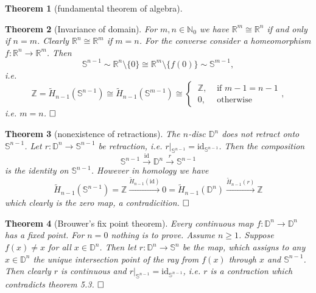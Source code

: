 \documentclass[11pt]{book}
\numberwithin{dummy}{section}
\newtheorem{theorem}{Theorem}[section]
\theoremstyle{nonumberbreak}
\newenvironment{pr}[1][]{\ifthenelse{\equal{#1}{}}{\proof}{\proof[#1]}\rm}{\endproof}
\newcommand{\Sph}{\mathbb{S}}
\newcommand{\la}{\longrightarrow}
\newcommand{\id}{\mathrm{id}}
\newcommand{\Z}{\mathbb{Z}}
\begin{document}
\begin{spacing}{1.4}
\begin{theorem}[fundamental theorem of algebra]
\begin{pr}
\end{pr}

\end{theorem}



\begin{theorem}[Invariance of domain]
For $m,n \in \mathbb{N}_0$ we have $\mathbb{R}^m \cong \mathbb{R}^n$ if and only if $n=m$.
\begin{pr}
Clearly $\mathbb{R}^n \cong \mathbb{R}^m$ if $m=n$. For the converse consider a homeomorphism $f: \mathbb{R}^n \la \mathbb{R}^m$. Then
$$\Sph^{n-1} \sim \mathbb{R}^n \setminus \{0\} \cong \mathbb{R}^m \setminus \{ f(0)\} \sim \Sph^{m-1},$$
i.e. 
$$\Z = \tilde{H}_{n-1}(\Sph^{n-1}) \cong \tilde{H}_{n-1}(\Sph^{m-1}) \cong \begin{cases} \ \Z, & \textrm{ if } m-1=n-1 \\ \ 0, & \textrm{ otherwise} \end{cases},$$
i.e. $m=n$. $\hfill \Box$
\end{pr}

\end{theorem}


\begin{theorem}[nonexistence of retractions]
The $n$-disc $\mathbb{D}^n$ does not retract onto $\Sph^{n-1}$.
\begin{pr}
Let $r: \mathbb{D}^n \la \Sph^{n-1}$ be retraction, i.e. $r\vert_{\Sph^{n-1}} = \id_{\Sph^{n-1}}$. Then the composition
$$\Sph^{n-1} \overset{\id}{\la} \mathbb{D}^n \overset{r}{\la} \Sph^{n-1}$$
is the identity on $\mathbb{S}^{n-1}$. However in homology we have
$$\tilde{H}_{n-1}(\mathbb{S}^{n-1}) = \mathbb{Z} \xrightarrow{\tilde{H}_{n-1}(\id)} 0 = \tilde{H}_{n-1}(\mathbb{D}^n) \xrightarrow{\tilde{H}_{n-1}(r)} \mathbb{Z}$$
which clearly is the zero map, a contradicition. $\hfill \Box$



\end{pr}
\end{theorem}


\begin{theorem}[Brouwer's fix point theorem]
Every continuous map $f: \mathbb{D}^n \la \mathbb{D}^n$ has a fixed point.
\begin{pr}
For $n=0$ nothing is to prove. Assume $n\geqslant 1$. Suppose $f(x) \neq x$ for all $x \in \mathbb{D}^n$. Then let 
$r: \mathbb{D}^n \la \Sph^n$ be the map, which assigns to any $x \in \mathbb{D}^n$ the unique intersection point of the ray from $f(x)$ through $x$ and $\Sph^{n-1}$. Then clearly $r$ is continuous and $r\vert_{\Sph^{n-1}} = \id_{\Sph^{n-1}}$, i.e. $r$ is a contraction which contradicts theorem 5.3. $\hfill \Box$


\end{pr}
\end{theorem}
\end{spacing}
\end{document}
